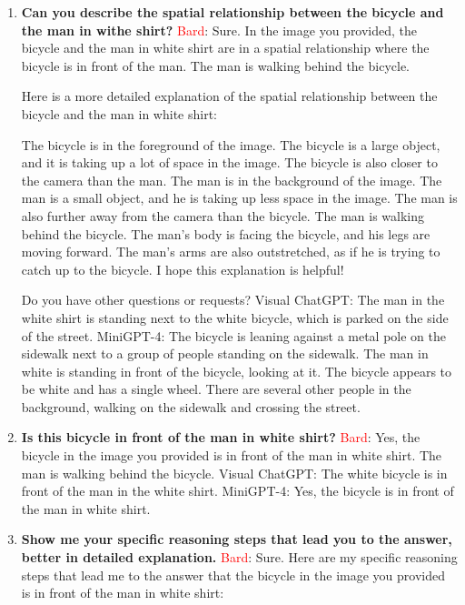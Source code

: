 \begin{enumerate}
    \item \textbf{Can you describe the spatial relationship between the bicycle and the man in withe shirt?}
    \subitem \textcolor{Red}{Bard}: Sure. In the image you provided, the bicycle and the man in white shirt are in a spatial relationship where the bicycle is in front of the man. The man is walking behind the bicycle.

    Here is a more detailed explanation of the spatial relationship between the bicycle and the man in white shirt:
    
    The bicycle is in the foreground of the image. The bicycle is a large object, and it is taking up a lot of space in the image. The bicycle is also closer to the camera than the man.
    The man is in the background of the image. The man is a small object, and he is taking up less space in the image. The man is also further away from the camera than the bicycle.
    The man is walking behind the bicycle. The man's body is facing the bicycle, and his legs are moving forward. The man's arms are also outstretched, as if he is trying to catch up to the bicycle.
    I hope this explanation is helpful!
    
    Do you have other questions or requests?
    \subitem Visual ChatGPT: The man in the white shirt is standing next to the white bicycle, which is parked on the side of the street.
    \subitem MiniGPT-4: The bicycle is leaning against a metal pole on the sidewalk next to a group of people standing on the sidewalk. The man in white is standing in front of the bicycle, looking at it. The bicycle appears to be white and has a single wheel. There are several other people in the background, walking on the sidewalk and crossing the street.
    \item \textbf{Is this bicycle in front of the man in white shirt?}
    \subitem \textcolor{Red}{Bard}: 
    Yes, the bicycle in the image you provided is in front of the man in white shirt. The man is walking behind the bicycle. 
    \subitem Visual ChatGPT: The white bicycle is in front of the man in the white shirt.
    \subitem MiniGPT-4: Yes, the bicycle is in front of the man in white shirt.
    \item \textbf{Show me your specific reasoning steps that lead you to the answer, better in detailed explanation.}
    \subitem \textcolor{Red}{Bard}: 
    Sure. Here are my specific reasoning steps that lead me to the answer that the bicycle in the image you provided is in front of the man in white shirt:


\end{enumerate}
